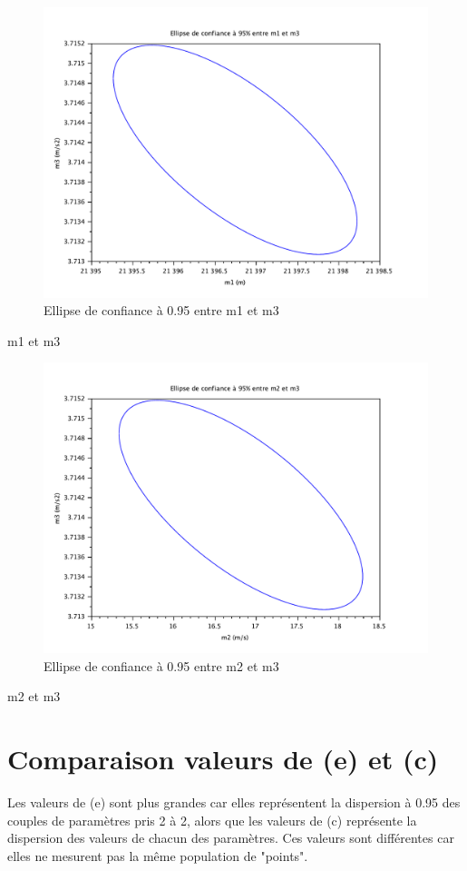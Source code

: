 \documentclass[12pt,a4paper]{extreport}
\begin{document}
\begin{figure}[h]
\begin{center}
\includegraphics[width=12cm]{../m1m3.pdf} 
\end{center}
\caption{Ellipse de confiance à 0.95 entre m1 et m3}
\end{figure}
m1 et m3
\newpage

\begin{figure}[h]
\begin{center}
\includegraphics[width=12cm]{../m2m3.pdf} 
\end{center}
\caption{Ellipse de confiance à 0.95 entre m2 et m3}
\end{figure}
m2 et m3

\newpage
\section{Comparaison valeurs de (e) et (c)}
Les valeurs de (e) sont plus grandes car elles représentent la dispersion à 0.95 des couples de paramètres pris 2 à 2, alors que les valeurs de (c) représente la dispersion des valeurs de chacun des paramètres. Ces valeurs sont différentes car elles ne mesurent pas la même population de "points".
\end{document}
